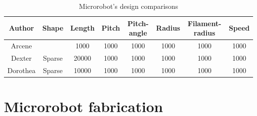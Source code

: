 \documentclass[12pt,a4paper,titlepage]{report}
\newcommand{\head}[1]{\textnormal{\textbf{#1}}}
\begin{document}















\begin{table}[!ht]

\centering%
{
\begin{tabular}{c c c c c c c c}%
\toprule[2.0pt]



\head{Author} & \head{Shape} & \head{Length} & \head{Pitch} & \head{Pitch-angle} & \head{Radius} & \head{Filament-radius} & \head{Speed}\\

\midrule
Arcene 	& 	    		  & 	1000		& 	1000		& 	1000		& 	1000		& 	1000		& 	1000\\%
Dexter 	& 	Sparse 		  & 	20000	& 	1000		& 	1000		& 	1000		& 	1000		& 	1000\\
Dorothea & 	Sparse 		  & 	10000	& 	1000		& 	1000		& 	1000		& 	1000		& 	1000\\[1ex]%



\bottomrule[2.0pt]
\end{tabular}
}
\label{table:nonlin}%
\caption{Microrobot\rq{}s design comparisons}\label{design}%
\end{table}










\section{Microrobot fabrication} \label{microFabric}
\subsection{}
\end{document}
